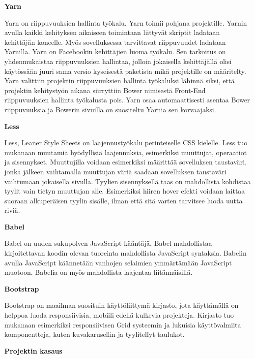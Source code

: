 \documentclass{tktltiki}
\begin{document}
\textbf{Yarn}

Yarn on riippuvuuksien hallinta työkalu. Yarn toimii pohjana projektille. Yarnin avulla kaikki kehityksen aikaiseen toimintaan liittyvät skriptit ladataan kehittäjän koneelle. Myös sovelluksessa tarvittavat riippuvuudet ladataan Yarnilla. Yarn on Facebookin kehittäjien luoma työkalu. Sen tarkoitus on yhdenmukaistaa riippuvuuksien hallintaa, jolloin jokaisella kehittäjällä olisi käytössään juuri sama versio kyseisestä paketista mikä projektille on määritelty. Yarn valittiin projektin riippuvuuksien hallinta työkaluksi lähinnä siksi, että projektin kehitystyön aikana siirryttiin Bower nimisestä Front-End riippuvuuksien hallinta työkalusta pois. Yarn osaa automaattisesti asentaa Bower riippuvuuksia ja Bowerin sivuilla on suositeltu Yarnia sen korvaajaksi. 

\textbf{Less}

Less, Leaner Style Sheets on laajennustyökalu perinteiselle CSS kielelle. Less tuo mukanaan muutamia hyödyllisiä laajennuksia, esimerkiksi muuttujat, operaatiot ja sisennykset. Muuttujilla voidaan esimerkiksi määrittää sovelluksen taustaväri, jonka jälkeen vaihtamalla muuttujan väriä saadaan sovelluksen taustaväri vaihtumaan jokaisella sivulla. Tyylien sisennyksellä taas on mahdollista kohdistaa tyylit vain tietyn muuttujan alle. Esimerkiksi hiiren hover efekti voidaan laittaa suoraan alkuperäisen tyylin sisälle, ilman että sitä varten tarvitsee luoda uutta riviä.

\textbf{Babel}

Babel on uuden sukupolven JavaScript kääntäjä. Babel mahdollistaa kirjoitettavan koodin olevan tuoreinta mahdollista JavaScript syntaksia. Babelin avulla JavaScript käännetään vanhojen selaimien ymmärtämään JavaScript muotoon. Babelia on myös mahdollista laajentaa liitännäisillä.

\textbf{Bootstrap}

Bootstrap on maailman suosituin käyttöliittymä kirjasto, jota käyttämällä on helppoa luoda responsiivisia, mobiili edellä kulkevia projekteja. Kirjasto tuo mukanaan esimerkiksi responsiivisen Grid systeemin ja lukuisia käyttövalmiita komponentteja, kuten kuvakarusellin ja tyylitellyt taulukot. 

\textbf{Projektin kasaus}
\end{document}

